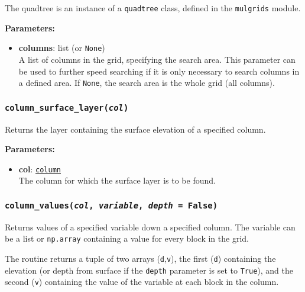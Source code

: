The quadtree is an instance of a \texttt{quadtree} class, defined in the \texttt{mulgrids} module.

\textbf{Parameters:}
\begin{itemize}
\item \textbf{columns}: list (or \texttt{None})\\
  A list of columns in the grid, specifying the search area.  This parameter can be used to further speed searching if it is only necessary to search columns in a defined area.  If \texttt{None}, the search area is the whole grid (all columns).
\end{itemize}

\begin{snugshade}\subsubsection{\texttt{column\_surface\_layer(\emph{col})}}\end{snugshade}
\label{sec:mulgrid:column_surface_layer}

Returns the layer containing the surface elevation of a specified column.

\textbf{Parameters:}
\begin{itemize}
\item \textbf{col}: \hyperref[columnobjects]{\texttt{column}}\\
  The column for which the surface layer is to be found.
\end{itemize}

\begin{snugshade}\subsubsection{\texttt{column\_values(\emph{col}, \emph{variable}, \emph{depth} = False)}}\end{snugshade}
\label{sec:mulgrid:column_values}

Returns values of a specified variable down a specified column.  The variable can be a list or \texttt{np.array} containing a value for every block in the grid.

The routine returns a tuple of two arrays (\texttt{d},\texttt{v}), the first (\texttt{d}) containing the elevation (or depth from surface if the \texttt{depth} parameter is set to \texttt{True}), and the second (\texttt{v}) containing the value of the variable at each block in the column.

